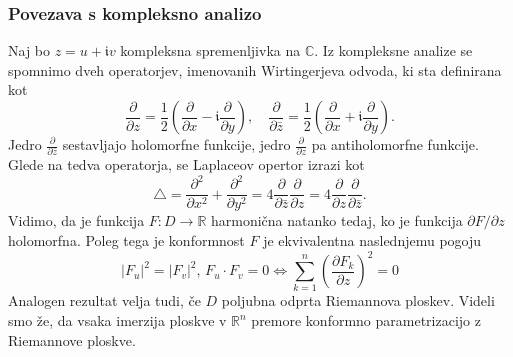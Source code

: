 \documentclass[8pt]{beamer}
\theoremstyle{definition}
\theoremstyle{remark}
\theoremstyle{plain}
\numberwithin{equation}{section}  %
\begin{document}
\begin{frame}
    \frametitle{Povezava s kompleksno analizo}

    Naj bo $z=u+\mathfrak{i} v$ kompleksna spremenljivka na $\mathbb{C}$. Iz kompleksne analize se spomnimo dveh operatorjev, imenovanih \textcolor{red1}{Wirtingerjeva odvoda}, ki sta definirana kot
    \begin{equation*}
        \frac{\partial}{\partial z}=\frac{1}{2}\left(\frac{\partial}{\partial x}-\mathfrak{i} \frac{\partial}{\partial y}\right), \quad \frac{\partial}{\partial \bar{z}}=\frac{1}{2}\left(\frac{\partial}{\partial x}+\mathfrak{i} \frac{\partial}{\partial y}\right).
    \end{equation*}
    Jedro $\frac{\partial}{\partial \bar{z}}$ sestavljajo holomorfne funkcije, jedro $\frac{\partial}{\partial z}$ pa antiholomorfne funkcije. Glede na tedva operatorja, se Laplaceov opertor izrazi kot 
    \begin{equation*}
        \bigtriangleup=\frac{\partial^2}{\partial x^2}+\frac{\partial^2}{\partial y^2}=4 \frac{\partial}{\partial \bar{z}} \frac{\partial}{\partial z}=4 \frac{\partial}{\partial z} \frac{\partial}{\partial \bar{z}} .
    \end{equation*} 
    Vidimo, da je funkcija $F: D \rightarrow \mathbb{R}$ harmonična natanko tedaj, ko je funkcija $\partial F / \partial z$ holomorfna.
    Poleg tega je konformnost $F$ je ekvivalentna naslednjemu pogoju
    \begin{equation*}
        \left| F_u \right|^2 = \left| F_v \right|^2, \, F_u\cdot F_v=0 \iff    \sum_{k=1}^n \left(\frac{\partial F_k}{\partial z}\right)^2 = 0
    \end{equation*}
    Analogen rezultat velja tudi, če $D$ poljubna \textcolor{red1}{odprta Riemannova ploskev}. Videli smo že, da vsaka imerzija ploskve v $\mathbb{R}^n$ premore konformno parametrizacijo z Riemannove ploskve. 

\end{frame}
\end{document}

